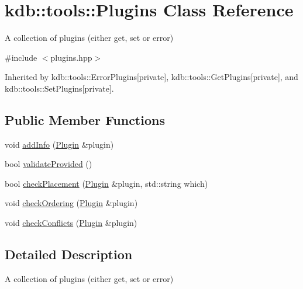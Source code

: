 \hypertarget{classkdb_1_1tools_1_1Plugins}{\section{kdb\-:\-:tools\-:\-:Plugins Class Reference}
\label{classkdb_1_1tools_1_1Plugins}
}


A collection of plugins (either get, set or error)  




{\ttfamily \#include $<$plugins.\-hpp$>$}



Inherited by kdb\-::tools\-::\-Error\-Plugins{\ttfamily  \mbox{[}private\mbox{]}}, kdb\-::tools\-::\-Get\-Plugins{\ttfamily  \mbox{[}private\mbox{]}}, and kdb\-::tools\-::\-Set\-Plugins{\ttfamily  \mbox{[}private\mbox{]}}.

\subsection*{Public Member Functions}
\begin{DoxyCompactItemize}
\item 
void \hyperlink{classkdb_1_1tools_1_1Plugins_a6d7e2c60d92999c025455669464f38c3}{add\-Info} (\hyperlink{classkdb_1_1tools_1_1Plugin}{Plugin} \&plugin)
\item 
bool \hyperlink{classkdb_1_1tools_1_1Plugins_a7ec1b0fe3e2f4fedc2fd286f0bfb859c}{validate\-Provided} ()
\item 
bool \hyperlink{classkdb_1_1tools_1_1Plugins_ad2e5c69bacc5dcad0f8a8dd6ef5893f7}{check\-Placement} (\hyperlink{classkdb_1_1tools_1_1Plugin}{Plugin} \&plugin, std\-::string which)
\item 
void \hyperlink{classkdb_1_1tools_1_1Plugins_a23729cbfff5127dc2de21651d855bdbd}{check\-Ordering} (\hyperlink{classkdb_1_1tools_1_1Plugin}{Plugin} \&plugin)
\item 
void \hyperlink{classkdb_1_1tools_1_1Plugins_a15432e4b3a4ba47eaa999f7dcc588562}{check\-Conflicts} (\hyperlink{classkdb_1_1tools_1_1Plugin}{Plugin} \&plugin)
\end{DoxyCompactItemize}


\subsection{Detailed Description}
A collection of plugins (either get, set or error) 

